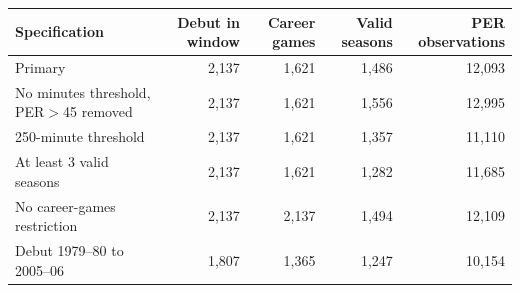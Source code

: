 \begin{tabular}{lrrrr}\toprule
Specification & Debut in window & Career games & Valid seasons & PER observations \\ \midrule
Primary & 2,137 & 1,621 & 1,486 & 12,093 \\
No minutes threshold, PER$>$45 removed & 2,137 & 1,621 & 1,556 & 12,995 \\
250-minute threshold & 2,137 & 1,621 & 1,357 & 11,110 \\
At least 3 valid seasons & 2,137 & 1,621 & 1,282 & 11,685 \\
No career-games restriction & 2,137 & 2,137 & 1,494 & 12,109 \\
Debut 1979--80 to 2005--06 & 1,807 & 1,365 & 1,247 & 10,154 \\
\bottomrule\end{tabular}